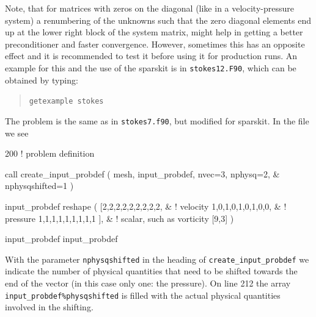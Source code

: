 Note, that for matrices with zeros on the diagonal (like in a
velocity-pressure system) a renumbering of the unknowns
such that the zero diagonal elements end up at the lower right block of the
system matrix, might help in getting a better preconditioner and faster convergence.
However, sometimes this has an opposite effect and
it is recommended to test it before using it for production runs.
An example for this and the use of the sparskit is in
\texttt{stokes12.F90}, which can be obtained by typing:
\begin{quote}
   \texttt{getexample stokes}
\end{quote}
The problem is
the same as in \texttt{stokes7.f90}, but modified for sparskit.
In the file we see
\begin{listing}{200}
! problem definition

  call create_input_probdef ( mesh, input_probdef, nvec=3, nphysq=2, &
    nphysqshifted=1 )

  input_probdef%
      reshape ( [2,2,2,2,2,2,2,2,2,    &  ! velocity
                 1,0,1,0,1,0,1,0,0,    &  ! pressure
                 1,1,1,1,1,1,1,1,1 ], &  ! scalar, such as vorticity
                 [9,3] )

  input_probdef%
  input_probdef%

\end{listing}
With the parameter \texttt{nphysqshifted} in the heading of
\texttt{create\_input\_probdef} we indicate the number of physical quantities
that need to be shifted towards the end of the vector (in this case only one:
the pressure). On line 212 the array \texttt{input\_probdef\%physqshifted}
is filled with the actual physical quantities involved in the shifting.

